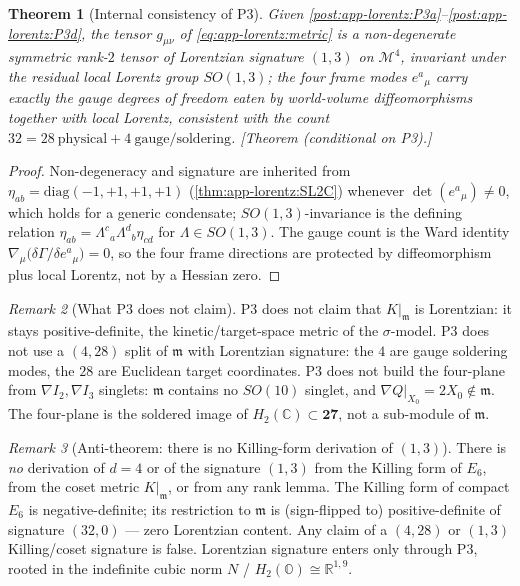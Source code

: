 \documentclass[11pt]{article}
\theoremstyle{plain}
\newtheorem{theorem}{Theorem}[section]
\theoremstyle{definition}
\theoremstyle{remark}
\newtheorem{remark}[theorem]{Remark}
\begin{document}
\begin{theorem}[Internal consistency of P3]
\label{thm:app-lorentz:P3consistency}
Given \autoref{post:app-lorentz:P3a}--\autoref{post:app-lorentz:P3d}, the tensor
$g_{\mu\nu}$ of \eqref{eq:app-lorentz:metric} is a non-degenerate symmetric rank-$2$
tensor of Lorentzian signature $(1,3)$ on $\mathcal{M}^{4}$, invariant under the
residual local Lorentz group $SO(1,3)$; the four frame modes $e^{a}{}_{\mu}$ carry
exactly the gauge degrees of freedom eaten by world-volume diffeomorphisms together
with local Lorentz, consistent with the count $32=28\ \text{physical}+4\ \text{gauge/soldering}$.
\emph{[Theorem (conditional on P3).]}
\end{theorem}

\begin{proof}
Non-degeneracy and signature are inherited from
$\eta_{ab}=\mathrm{diag}(-1,+1,+1,+1)$ (\autoref{thm:app-lorentz:SL2C}) whenever
$\det(e^{a}{}_{\mu})\ne0$, which holds for a generic condensate;
$SO(1,3)$-invariance is the defining relation
$\eta_{ab}=\Lambda^{c}{}_{a}\Lambda^{d}{}_{b}\eta_{cd}$ for
$\Lambda\in SO(1,3)$. The gauge count is the Ward identity
$\nabla_{\mu}\big(\delta\Gamma/\delta e^{a}{}_{\mu}\big)=0$, so the four frame
directions are protected by diffeomorphism plus local Lorentz, not by a Hessian zero.
\end{proof}

\begin{remark}[What P3 does not claim]
\label{rmk:app-lorentz:notclaim}
P3 does not claim that $K|_{\mathfrak{m}}$ is Lorentzian: it stays positive-definite,
the kinetic/target-space metric of the $\sigma$-model. P3 does not use a $(4,28)$
split of $\mathfrak{m}$ with Lorentzian signature: the $4$ are gauge soldering modes,
the $28$ are Euclidean target coordinates. P3 does not build the four-plane from
$\nabla I_{2},\nabla I_{3}$ singlets: $\mathfrak{m}$ contains no $SO(10)$ singlet, and
$\nabla Q|_{X_{0}}=2X_{0}\notin\mathfrak{m}$. The four-plane is the soldered image of
$H_{2}(\mathbb{C})\subset\mathbf{27}$, not a sub-module of $\mathfrak{m}$.
\end{remark}

\begin{remark}[Anti-theorem: there is no Killing-form derivation of \texorpdfstring{$(1,3)$}{(1,3)}]
\label{rmk:app-lorentz:anti}
There is \emph{no} derivation of $d=4$ or of the signature $(1,3)$ from the Killing
form of $E_{6}$, from the coset metric $K|_{\mathfrak{m}}$, or from any rank lemma.
The Killing form of compact $E_{6}$ is negative-definite; its restriction to
$\mathfrak{m}$ is (sign-flipped to) positive-definite of signature $(32,0)$ --- zero
Lorentzian content. Any claim of a $(4,28)$ or $(1,3)$ Killing/coset signature is
false. Lorentzian signature enters only through P3, rooted in the indefinite cubic
norm $N$ / $H_{2}(\mathbb{O})\cong\mathbb{R}^{1,9}$.
\end{remark}
\end{document}
